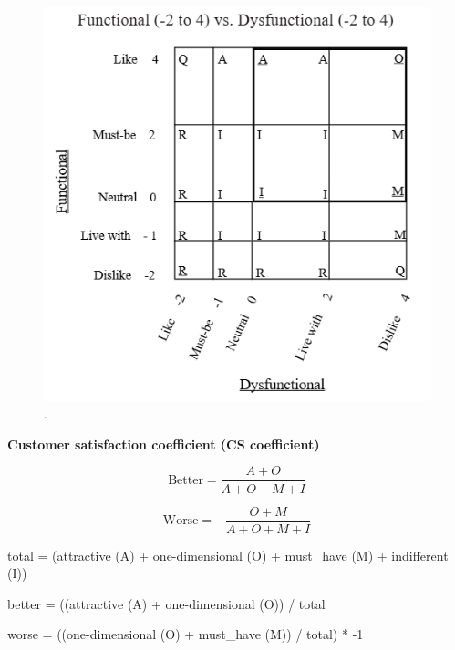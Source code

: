 \documentclass[../main.tex]{subfiles}
\begin{document}
\begin{figure}[h]
        \centering
        \includegraphics[scale=0.8]{img/2-background/kano/analysis.png}
        \caption{ \cite{berger1993kano}.}
        \label{fig:analysis}
\end{figure}

\textbf{Customer satisfaction coefficient (CS coefficient)}

\cite{timko1993}

\begin{equation}
    \text{Better} = \frac{A + O}{A + O + M + I}
\end{equation}

\begin{equation}
    \text{Worse} = - \frac{O + M }{A + O + M + I}
\end{equation}

total = (attractive (A) + one-dimensional (O) + must\_have (M) + indifferent (I))

better = ((attractive (A) + one-dimensional (O)) / total

worse = ((one-dimensional (O) + must\_have (M)) / total) * -1
\end{document}

